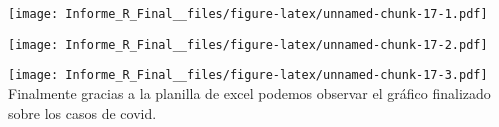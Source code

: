 \documentclass[]{elsarticle} %
\newenvironment{Shaded}{\begin{snugshade}}{\end{snugshade}}
\newcommand{\DecValTok}[1]{\textcolor[rgb]{0.00,0.00,0.81}{#1}}
\newcommand{\FunctionTok}[1]{\textcolor[rgb]{0.00,0.00,0.00}{#1}}
\newcommand{\NormalTok}[1]{#1}
\newcommand{\SpecialCharTok}[1]{\textcolor[rgb]{0.00,0.00,0.00}{#1}}
\begin{document}
\texttt{[image: Informe\_R\_Final\_\_files/figure-latex/unnamed-chunk-17-1.pdf]}

\begin{Shaded}
\end{Shaded}

\texttt{[image: Informe\_R\_Final\_\_files/figure-latex/unnamed-chunk-17-2.pdf]}

\begin{Shaded}
\end{Shaded}

\texttt{[image: Informe\_R\_Final\_\_files/figure-latex/unnamed-chunk-17-3.pdf]}
Finalmente gracias a la planilla de excel podemos observar el gráfico
finalizado sobre los casos de covid.
\end{document}
